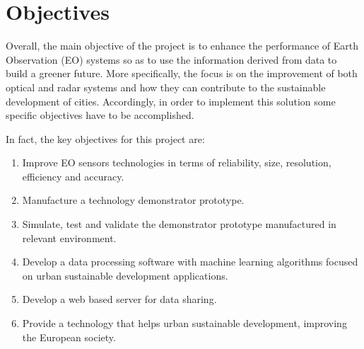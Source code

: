 \section{Objectives}

Overall, the main objective of the project is to enhance the performance of Earth Observation (EO) systems so as to use the information derived from data to build a greener future. More specifically, the focus is on the improvement of both optical and radar systems and how they can contribute to the sustainable development of cities. Accordingly, in order to implement this solution some specific objectives have to be accomplished.

In fact, the key objectives for this project are:

\begin{enumerate}

	\item Improve EO sensors technologies in terms of reliability, size, resolution, efficiency and accuracy.

	\item Manufacture a technology demonstrator prototype.

	\item Simulate, test and validate the demonstrator prototype manufactured in relevant environment.

	\item Develop a data processing software with machine learning algorithms focused on urban sustainable development applications. 

	\item Develop a web based server for data sharing. 

	\item Provide a technology that helps urban sustainable development, improving the European society.
 
\end{enumerate}